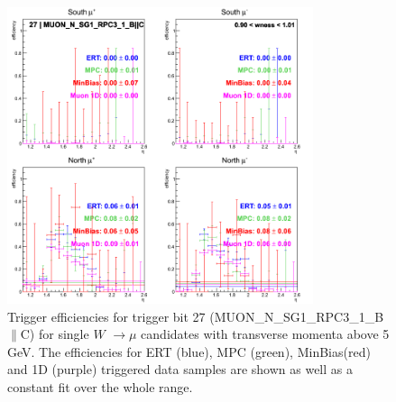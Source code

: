 \clearpage
\begin{figure}[h!]

  \centering

  \includegraphics[width=0.8\textwidth]{./figures/run13_trigeffieta_w1_trig27_lin.png}
  \caption{\label{fig:run13_trigeffieta_w0_nper0_trig27_lin} Trigger efficiencies for trigger bit 27 (MUON\_N\_SG1\_RPC3\_1\_B$\|$C) for single $W$ $\rightarrow \mu$ candidates with transverse momenta above 5 GeV. The efficiencies for ERT (blue), MPC (green), MinBias(red) and 1D (purple) triggered data samples are shown as well as a constant fit over the whole range.}

\end{figure}
\clearpage
